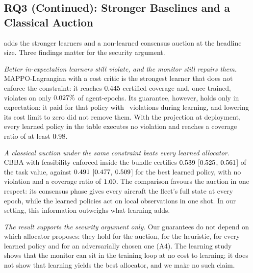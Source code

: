 \begin{table}[t]
\centering\footnotesize
\setlength{\tabcolsep}{3.5pt}
\caption{RQ3. Held-out evaluation ($N=12$, $M=8$; \nNSeeds\ training seeds $\times$ 3
evaluation seeds $\times$ 16 fleets for learned methods; 3 $\times$ 16 for the references
below the line). Values are IQMs with 95\% stratified-bootstrap CIs. Cov.\ ratio: feasible
holders divided by $(M-d)$. Violations are in \% of agent-epochs (IQM over runs). ``$0\,(\le
x)$'': none observed, with the 95\% CP upper bound on the rate, assuming independent
agent-epochs. Train viol.: executed infeasible assignments over all of training.}
\label{tab:main}

\end{table}

\subsection{RQ3 (Continued): Stronger Baselines and a Classical Auction}
\label{sec:rq3b}
 adds the stronger learners and a non-learned consensus auction at the
headline size. Three findings matter for the security argument.

\emph{Better in-expectation learners still violate, and the monitor still repairs them.}
MAPPO-Lagrangian with a cost critic is the strongest learner that does not enforce the
constraint: it reaches
$0.445$ certified coverage and, once trained, violates on only $0.027\%$ of
agent-epochs. Its guarantee, however, holds only in expectation: it paid for that policy
with \nMLagTrainViol\ violations during learning, and lowering its cost limit to zero did not
remove them. With the projection at deployment, every learned policy in the table executes
no violation and reaches a coverage ratio of at least $0.98$.

\emph{A classical auction under the same constraint beats every learned allocator.} CBBA
with feasibility enforced inside the bundle certifies $0.539$ [$0.525$,
$0.561$] of the task value, against $0.491$ [$0.477$, $0.509$] for the
best learned policy, with no violation and a coverage ratio of $1.00$. The comparison
favours the auction in one respect: its consensus phase gives every aircraft the fleet's full
state at every epoch, while the learned policies act on local observations in one shot. In
our setting, this information outweighs what learning adds.

\emph{The result supports the security argument only.} Our guarantees do not
depend on which allocator proposes: they hold for the auction, for the heuristic, for every
learned policy and for an adversarially chosen one (A4). The learning study shows that the
monitor can sit in the training loop at no cost to learning; it does not show that learning
yields the best allocator, and we make no such claim.

